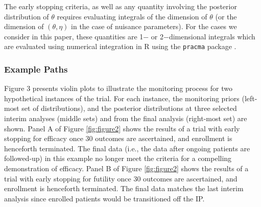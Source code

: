 \documentclass[AMA,STIX1COL,doublespace]{WileyNJD-v2}
\begin{document}
The early stopping criteria, as well as any quantity involving the posterior distribution of $\theta$ requires evaluating integrals of the dimension of $\theta$ (or the dimension of $(\theta,\eta)$ in the case of nuisance parameters).
%
For the cases we consider in this paper, these quantities are 1$-$ or 2$-$dimensional integrals which are evaluated using numerical integration in R \citep{R2017} using the \texttt{pracma} package \citep{Borchers2019}.

\subsubsection{Example Paths}
Figure 3 presents violin plots to illustrate the monitoring process for two hypothetical instances of the trial. 
%
For each instance, the monitoring priors (left-most set of distributions), and the posterior distributions at three selected interim analyses (middle sets) and from the final analysis (right-most set) are shown.
Panel A of Figure \ref{fig:figure2} shows the results of a trial with early stopping for efficacy once 30 outcomes are ascertained, and enrollment is henceforth terminated. 
%
The final data (i.e., the data after ongoing patients are followed-up) in this example no longer meet the criteria for a compelling demonstration of efficacy.
%
Panel B of Figure \ref{fig:figure2} shows the results of a trial with early stopping for futility once 30 outcomes are ascertained, and enrollment is henceforth terminated. The final data matches the last interim analysis since enrolled patients would be transitioned off the IP.
\end{document}
